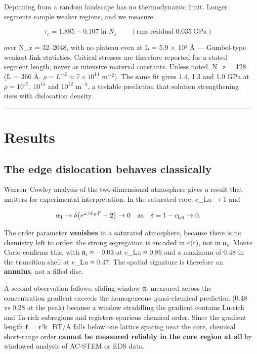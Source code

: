 Depinning from a random landscape has no thermodynamic limit. Longer segments sample weaker regions, and we measure

\[\tau_c = 1.885 - 0.107\ln N_z\qquad(\text{rms residual }0.035\ \text{GPa})\]

over N\_z = 32--2048, with no plateau even at L = 5.9 × 10³ Å --- Gumbel-type weakest-link statistics. Critical stresses are therefore reported for a stated segment length, never as intensive material constants. Unless noted, N\_z = 128 (L = 366 Å, \(\rho = L^{-2}\approx7\times10^{14}\) m\(^{-2}\)). The same fit gives 1.4, 1.3 and 1.0 GPa at \(\rho = 10^{15}\), \(10^{14}\) and \(10^{12}\) m\(^{-2}\), a testable prediction that solution strengthening rises with dislocation density.

\begin{center}\rule{0.5\linewidth}{0.5pt}\end{center}

\hypertarget{results}{%
\section{Results}\label{sec:results}}

\hypertarget{the-edge-dislocation-behaves-classically}{%
\subsection{The edge dislocation behaves classically}\label{sec:the-edge-dislocation-behaves-classically}}

Warren--Cowley analysis \cite{warren1969} of the two-dimensional atmosphere gives a result that matters for experimental interpretation. In the saturated core, c\_Lu → 1 and

\[\alpha_1 \to \delta\bigl(e^{\omega/k_BT} - 2\bigr) \to 0 \quad\text{as}\quad \delta = 1 - c_{\rm Lu} \to 0.\]

The order parameter \textbf{vanishes} in a saturated atmosphere, because there is no chemistry left to order: the strong segregation is encoded in c(r), not in α₁. Monte Carlo confirms this, with α₁ ≈ −0.03 at c\_Lu ≈ 0.86 and a maximum of 0.48 in the transition shell at c\_Lu ≈ 0.47. The spatial signature is therefore an \textbf{annulus}, not a filled disc.

A second observation follows: sliding-window α₁ measured across the concentration gradient exceeds the homogeneous quasi-chemical prediction (0.48 vs 0.28 at the peak) because a window straddling the gradient contains Lu-rich and Ta-rich subregions and registers spurious chemical order. Since the gradient length ℓ = r²k\_BT/A falls below one lattice spacing near the core, chemical short-range order \textbf{cannot be measured reliably in the core region at all} by windowed analysis of AC-STEM or EDS data.

